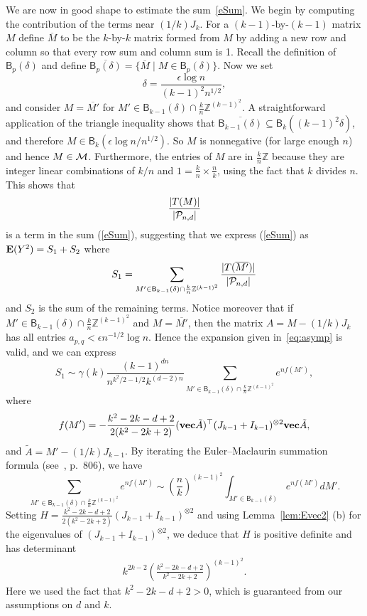 \documentclass[12pt]{article}
\newcommand{\lab}[1]{\label{#1}}
\def\P{{\cal P}}
\def\ex{{\bf E}}
\def\BZ{{\mathbb Z}}
\def\Pnd{\P_{n,d}}
\def\be{\begin{equation}}
\def\ee{\end{equation}}
\newcommand{\eqn}[1]{(\ref{#1})}
\newcommand{\bel}[1]{\be\lab{#1}}
\def\transpose{\top}
\def\mvec{{\bf vec}}
\def\Z{\BZ}
\def\M{{\cal M}}
\newcommand{\B} {\ensuremath{\mathsf B}}
\begin{document}
We are now in good shape to estimate the sum~\eqref{eSum}.
We begin by computing the contribution of the terms near $(1/k)J_k$.
For a $(k-1)$-by-$(k-1)$ 
matrix $M$ define $\overline M$ to be the $k$-by-$k$ matrix formed 
from $M$ by adding a new row and column so that every row sum 
and column sum is 1.
Recall the definition of $\B_p(\delta)$ and define $\overline{\B_p(\delta)}=\{\overline M \mid M\in \B_p(\delta)\}$.
%
Now we set
\[
\delta = \frac{\epsilon\log n}{(k-1)^2 n^{1/2}},
\]
and consider $M=\overline{M'}$ for $M'\in \B_{k-1}(\delta)\cap \frac{k}{n}\Z^{(k-1)^2}$.
A straightforward application of the triangle inequality shows that $\overline{\B_{k-1}(\delta)}\subseteq\B_k((k-1)^2\delta)$, and therefore
 $M \in \B_k(\epsilon\log n/n^{1/2})$. So $M$
is nonnegative (for large enough $n$) and hence $M\in \M$. Furthermore, the entries of 
$M$ are in $\frac{k}{n}\Z$ because they are integer linear
combinations of $k/n$ and $1=\frac{k}{n}\times \frac{n}{k}$, using the
fact that $k$ divides $n$. This shows that
\[
\frac{|T(M)|}{|\Pnd|}
\]
is a term in the sum \eqn{eSum}, suggesting that we express \eqn{eSum}
as $\ex(Y^2) = S_1+S_2$ where
\[
S_1 = \sum_{M'\in \B_{k-1}(\delta)\cap \frac{k}{n}\Z^{(k-1)^2}}
\frac{|T(\overline{M'})|}{|\Pnd|}
\]
and $S_2$ is the sum of the remaining terms.
Notice moreover that if $M'\in \B_{k-1}(\delta)\cap \frac{k}{n}\Z^{(k-1)^2}$ and $M=\overline{M'}$, then the matrix $A=M-(1/k)J_k$ has all entries $a_{p,q} < \epsilon n^{-1/2}\log n$. Hence the expansion given in~\eqref{eq:asymp} is valid, and we can express
\bel{eS1}
S_1 \sim \gamma(k) \frac{(k-1)^{dn}}{n^{k^2/2-1/2} k^{(d-2)n}} \sum_{M'\in \B_{k-1}(\delta)\cap \frac{k}{n}\Z^{(k-1)^2}} e^{nf(M')},
\ee
where
\[
f(M') = - \frac{k^2-2k-d+2}{2(k^2-2k+2)}
(\mvec \tilde A)^\transpose (J_{k-1}+I_{k-1})^{\otimes 2} \mvec \tilde A,
\]
and $\tilde A = M'-(1/k)J_{k-1}$.
%
By iterating the Euler--Maclaurin summation formula
(see~\cite{AS72}, p.~$806$), we have
\[
\sum_{M'\in \B_{k-1}(\delta)\cap \frac{k}{n}\Z^{(k-1)^2}} e^{nf(M')} \sim
\left(\frac{n}{k}\right)^{(k-1)^2}
\int_{M'\in \B_{k-1}(\delta)} e^{nf(M')}dM'.
\]
Setting $H = \frac{k^2-2k-d+2}{2(k^2-2k+2)} (J_{k-1}+I_{k-1})^{\otimes 2}$ and using Lemma~\ref{lem:Evec2} (b) for the eigenvalues of $(J_{k-1}+I_{k-1})^{\otimes 2}$, we deduce that $H$ is positive definite and has determinant
\begin{eqnarray}
k^{2k-2}\left(\frac{k^2-2k-d+2}{k^2-2k+2}\right)^{(k-1)^2}.
\lab{eDet}
\end{eqnarray}
Here we used the fact that $k^2-2k-d+2>0$, which is guaranteed from our assumptions on $d$ and $k$.
\end{document}
